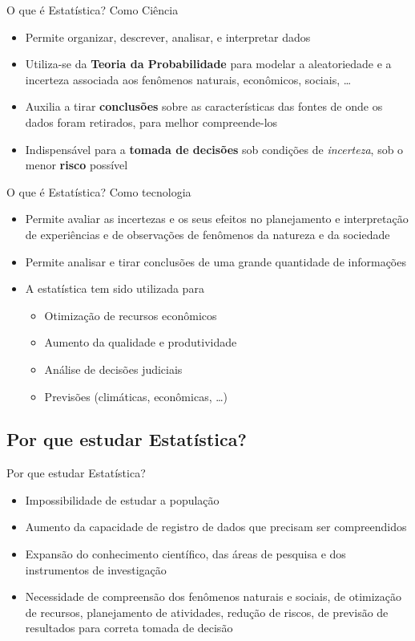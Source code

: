 \documentclass[10pt]{beamer}
\theoremstyle{definition}
\begin{document}
\begin{frame}{O que é Estatística?}
Como Ciência
\begin{itemize}
\item Permite organizar, descrever, analisar, e interpretar dados
\item Utiliza-se da \textbf{Teoria da Probabilidade} para modelar a
  aleatoriedade e a incerteza associada aos fenômenos naturais,
  econômicos, sociais, \ldots
\item Auxilia a tirar \textbf{conclusões} sobre as características das
  fontes de onde os dados foram retirados, para melhor compreende-los
\item Indispensável para a \textbf{tomada de decisões} sob condições de
  \textsl{incerteza}, sob o menor \textbf{risco} possível
\end{itemize}
\end{frame}

\begin{frame}{O que é Estatística?}
Como tecnologia
\begin{itemize}
\item Permite avaliar as incertezas e os seus efeitos no planejamento e
  interpretação de experiências e de observações de fenômenos da
  natureza e da sociedade
\item Permite analisar e tirar conclusões de uma grande quantidade de
  informações
\item A estatística tem sido utilizada para
  \begin{itemize}
  \item Otimização de recursos econômicos
  \item Aumento da qualidade e produtividade
  \item Análise de decisões judiciais
  \item Previsões (climáticas, econômicas, \ldots)
  \end{itemize}
\end{itemize}
\end{frame}

\subsection[Por que?]{Por que estudar Estatística?}

\begin{frame}{Por que estudar Estatística?}
  \begin{itemize}
  \item Impossibilidade de estudar a população
  \item Aumento da capacidade de registro de dados que precisam ser
    compreendidos
  \item Expansão do conhecimento científico, das áreas de pesquisa e dos
    instrumentos de investigação
  \item Necessidade de compreensão dos fenômenos naturais e sociais, de
    otimização de recursos, planejamento de atividades, redução de riscos,
    de previsão de resultados para correta tomada de decisão
  \end{itemize}
\end{frame}
\end{document}
